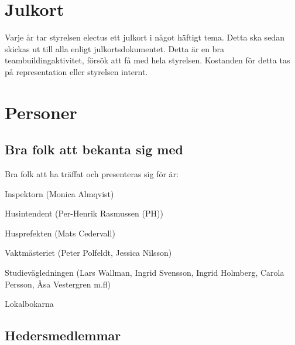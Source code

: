 \documentclass[10pt]{article}
\begin{document}
\section{Julkort}

Varje år tar styrelsen electus ett julkort i något häftigt tema. Detta ska sedan skickas ut till alla enligt julkortsdokumentet. Detta är en bra teambuildingaktivitet, försök att få med hela styrelsen. Kostanden för detta tas på representation eller styrelsen internt.

\section{Personer}

\subsection{Bra folk att bekanta sig med}

Bra folk att ha träffat och presenteras sig för är:
\begin{dashlist}
\item Inspektorn (Monica Almqvist)
\item Husintendent (Per-Henrik Rasmussen (PH))
\item Husprefekten (Mats Cedervall)
\item Vaktmästeriet (Peter Polfeldt, Jessica Nilsson)
\item Studievägledningen (Lars Wallman, Ingrid Svensson, Ingrid Holmberg, Carola Persson, Åsa Vestergren m.fl)
\item Lokalbokarna
\end{dashlist}

\subsection{Hedersmedlemmar}
\end{document}
